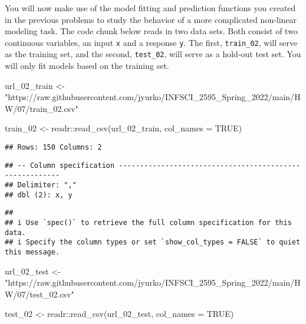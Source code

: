 \documentclass[
]{article}
\newenvironment{Shaded}{\begin{snugshade}}{\end{snugshade}}
\newcommand{\AttributeTok}[1]{\textcolor[rgb]{0.77,0.63,0.00}{#1}}
\newcommand{\ConstantTok}[1]{\textcolor[rgb]{0.00,0.00,0.00}{#1}}
\newcommand{\FunctionTok}[1]{\textcolor[rgb]{0.00,0.00,0.00}{#1}}
\newcommand{\NormalTok}[1]{#1}
\newcommand{\OtherTok}[1]{\textcolor[rgb]{0.56,0.35,0.01}{#1}}
\newcommand{\SpecialCharTok}[1]{\textcolor[rgb]{0.00,0.00,0.00}{#1}}
\newcommand{\StringTok}[1]{\textcolor[rgb]{0.31,0.60,0.02}{#1}}
\begin{document}
You will now make use of the model fitting and prediction functions you
created in the previous problems to study the behavior of a more
complicated non-linear modeling task. The code chunk below reads in two
data sets. Both consist of two continuous variables, an input \texttt{x}
and a response \texttt{y}. The first, \texttt{train\_02}, will serve as
the training set, and the second, \texttt{test\_02}, will serve as a
hold-out test set. You will only fit models based on the training set.

\begin{Shaded}
\begin{Highlighting}[]
\NormalTok{url\_02\_train }\OtherTok{\textless{}{-}} \StringTok{"https://raw.githubusercontent.com/jyurko/INFSCI\_2595\_Spring\_2022/main/HW/07/train\_02.csv"}

\NormalTok{train\_02 }\OtherTok{\textless{}{-}}\NormalTok{ readr}\SpecialCharTok{::}\FunctionTok{read\_csv}\NormalTok{(url\_02\_train, }\AttributeTok{col\_names =} \ConstantTok{TRUE}\NormalTok{)}
\end{Highlighting}
\end{Shaded}

\begin{verbatim}
## Rows: 150 Columns: 2
\end{verbatim}

\begin{verbatim}
## -- Column specification --------------------------------------------------------
## Delimiter: ","
## dbl (2): x, y
\end{verbatim}

\begin{verbatim}
## 
## i Use `spec()` to retrieve the full column specification for this data.
## i Specify the column types or set `show_col_types = FALSE` to quiet this message.
\end{verbatim}

\begin{Shaded}
\begin{Highlighting}[]
\NormalTok{url\_02\_test }\OtherTok{\textless{}{-}} \StringTok{"https://raw.githubusercontent.com/jyurko/INFSCI\_2595\_Spring\_2022/main/HW/07/test\_02.csv"}

\NormalTok{test\_02 }\OtherTok{\textless{}{-}}\NormalTok{ readr}\SpecialCharTok{::}\FunctionTok{read\_csv}\NormalTok{(url\_02\_test, }\AttributeTok{col\_names =} \ConstantTok{TRUE}\NormalTok{)}
\end{Highlighting}
\end{Shaded}
\end{document}
